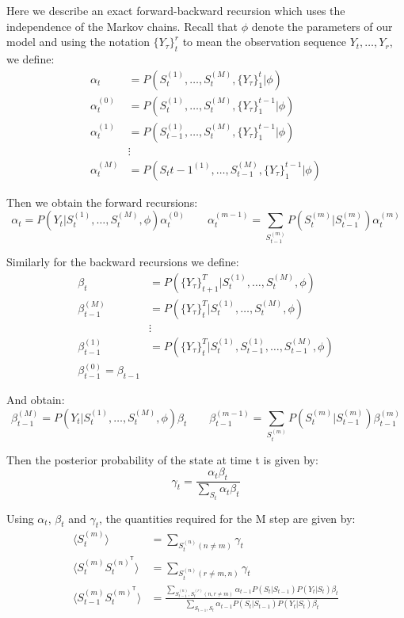 \documentclass{article}
\begin{document}
Here we describe an exact forward-backward recursion which uses the independence of the Markov chains. Recall that $\phi$ denote the parameters of our model and using the notation $\{ Y_\tau \}_t^r$ to mean the observation sequence $Y_t,\dots,Y_r$, we define:
\begin{align*}
\alpha_t &= P(S_t^{(1)},\dots,S_t^{(M)}, \{Y_\tau \}_1^t | \phi) \\
\alpha_t^{(0)} &= P(S_t^{(1)},\dots,S_t^{(M)}, \{Y_\tau \}_1^{t-1} | \phi) \\
\alpha_t^{(1)} &= P(S_{t-1}^{(1)},\dots,S_t^{(M)}, \{Y_\tau \}_1^{t-1} | \phi) \\
&\vdots \\
\alpha_t^{(M)} &= P(S_t{t-1}^{(1)},\dots,S_{t-1}^{(M)}, \{Y_\tau \}_1^{t-1} | \phi)
\end{align*}

Then we obtain the forward recursions:
\[ \alpha_t = P(Y_t | S_t^{(1)},\dots,S_t^{(M)}, \phi) \alpha_t^{(0)} \qquad \alpha_t^{(m-1)} = \sum_{S_{t-1}^{(m)}} P(S_t^{(m)} | S_{t-1}^{(m)}) \alpha_t^{(m)} \]

Similarly for the backward recursions we define:
\begin{align*}
\beta_t &= P(\{Y_\tau \}_{t+1}^T | S_t^{(1)},\dots,S_t^{(M)}, \phi) \\
\beta_{t-1}^{(M)} &= P(\{Y_\tau \}_{t}^T | S_t^{(1)},\dots,S_t^{(M)}, \phi) \\
&\vdots \\ 
\beta_{t-1}^{(1)} &= P(\{Y_\tau \}_{t}^T | S_t^{(1)}, S_{t-1}^{(1)}, \dots,S_{t-1}^{(M)}, \phi) \\
\beta_{t-1}^{(0)} = \beta_{t-1}
\end{align*}

And obtain:
\[ \beta_{t-1}^{(M)} = P(Y_t | S_t^{(1)},\dots,S_t^{(M)}, \phi) \beta_t \qquad \beta_{t-1}^{(m-1)} = \sum_{S_{t}^{(m)}} P(S_t^{(m)} | S_{t-1}^{(m)}) \beta_{t-1}^{(m)} \]

Then the posterior probability of the state at time t is given by:
\[ \gamma_t = \frac{\alpha_t \beta_t}{\sum_{S_t} \alpha_t \beta_t} \]

Using $\alpha_t$, $\beta_t$ and $\gamma_t$, the quantities required for the M step are given by:
\begin{align*}
\langle S_t^{(m)} \rangle &= \sum_{S_t^{(n)} (n \ne m)} \gamma_t \\
\langle S_t^{(m)} S_t^{(n)^\mathsf{T}} \rangle &= \sum_{S_t^{(n)} (r \ne m,n)} \gamma_t \\
\langle S_{t-1}^{(m)} S_t^{(m)^\mathsf{T}} \rangle &= \frac{\sum_{S_{t-1}^{(n)},S_t^{(r)} (n,r \ne m)} \alpha_{t-1} P(S_t | S_{t-1}) P(Y_t | S_t) \beta_t}{\sum_{S_{t-1},S_t} \alpha_{t-1} P(S_t | S_{t-1}) P(Y_t | S_t) \beta_t}
\end{align*}
\end{document}
